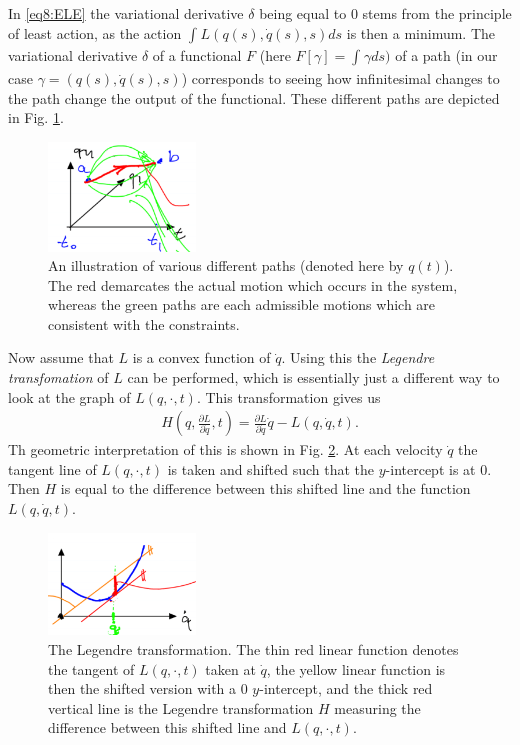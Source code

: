 \begin{ex}
\begin{remark}[]
	In \eqref{eq8:ELE} the variational derivative $\delta$ being equal to 0 stems from the principle of least action, as the action $\int_{}^{} L(q(s), \dot{q}(s), s)ds$ is then a minimum. The variational derivative $\delta$ of a functional $F$ (here $F[\gamma]=\int_{}^{} \gamma ds)$ of a path (in our case $\gamma = (q(s), \dot{q}(s), s)$) corresponds to seeing how infinitesimal changes to the path change the output of the functional. These different paths are depicted in Fig. \ref{fig:variational_deriv}.
	\begin{figure}[h!]
		\centering
		\includegraphics[width=0.35\textwidth]{figures/ch8/1variational_deriv.png}
		\caption{An illustration of various different paths (denoted here by $q(t)$). The red demarcates the actual motion which occurs in the system, whereas the green paths are each admissible motions which are consistent with the constraints.}
		\label{fig:variational_deriv}
	\end{figure}
\end{remark}
Now assume that $L$ is a convex function of $\dot{q}$. Using this the \emph{Legendre transfomation} of $L$ can be performed, which is essentially just a different way to look at the graph of $L(q, \cdot, t)$. This transformation gives us
\begin{align}
	H\left(q, \frac{\partial L}{\partial \dot{q}}, t\right) = \frac{\partial L}{\partial \dot{q}}\dot{q} - L(q, \dot{q}, t).
\end{align}
Th geometric interpretation of this is shown in Fig. \ref{fig:legendre_trafo}. At each velocity $\dot{q}$ the tangent line of $L(q, \cdot, t)$ is taken and shifted such that the $y$-intercept is at $0$. Then $H$ is equal to the difference between this shifted line and the function $L(q, \dot{q}, t)$.
\begin{figure}[h!]
	\centering
	\includegraphics[width=0.35\textwidth]{figures/ch8/2legendre_trafo.png}
	\caption{The Legendre transformation. The thin red linear function denotes the tangent of $L(q, \cdot, t)$ taken at  $\dot{q}$, the yellow linear function is then the shifted version with a 0 $y$-intercept, and the thick red vertical line is the Legendre transformation $H$ measuring the difference between this shifted line and $L(q,\cdot, t)$.}
	\label{fig:legendre_trafo}
\end{figure}


\end{ex}

